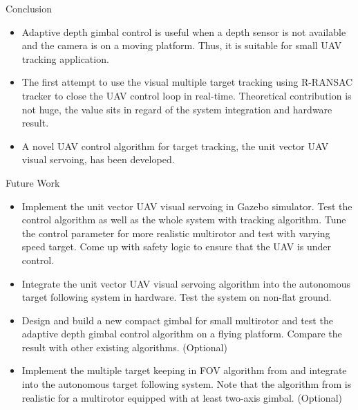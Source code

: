 \documentclass[9pt]{beamer}
\begin{document}
\begin{frame}{Conclusion}
\begin{itemize}
	\item Adaptive depth gimbal control is useful
	when a depth sensor is not available and the camera is on a moving platform. Thus, it is suitable for small UAV tracking application.
	\item The first attempt to use the visual multiple target tracking using R-RANSAC tracker to close the UAV control loop in real-time. Theoretical contribution is not huge, the value sits in regard of the system integration and hardware result.
	\item A novel UAV control algorithm for target tracking, the unit vector UAV visual servoing, has been developed.
\end{itemize}
\end{frame}

\begin{frame}{Future Work}
\begin{itemize}
	\item Implement the unit vector UAV visual servoing in Gazebo simulator. Test the control algorithm as well as the whole system with tracking algorithm. Tune the control parameter for more realistic multirotor and test with varying speed target. Come up with safety logic to ensure that the UAV is under control.
	\item Integrate the unit vector UAV visual servoing algorithm into the autonomous target following system in hardware. Test the system on non-flat ground. 
	\item Design and build a new compact gimbal for small multirotor and test the adaptive depth gimbal control algorithm on a flying platform. Compare the result with other existing algorithms. (Optional)
	\item Implement the multiple target keeping in FOV algorithm from \cite{Gans2011} and integrate into the autonomous target following system. Note that the algorithm from \cite{Gans2011} is realistic for a multirotor equipped with at least two-axis gimbal. (Optional)
\end{itemize}
\end{frame}
\end{document}
